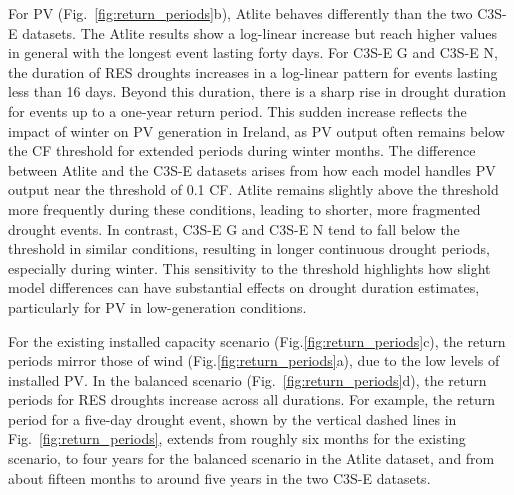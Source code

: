 \documentclass[a4paper, 11pt]{article}
\begin{document}
For PV (Fig.~\ref{fig:return_periods}b), Atlite behaves differently than the two C3S-E datasets. The Atlite results show a log-linear increase but reach higher values in general with the longest event lasting forty days. For C3S-E G and C3S-E N, the duration of RES droughts increases in a log-linear pattern for events lasting less than 16 days. Beyond this duration, there is a sharp rise in drought duration for events up to a one-year return period. This sudden increase reflects the impact of winter on PV generation in Ireland, as PV output often remains below the CF threshold for extended periods during winter months. The difference between Atlite and the C3S-E datasets arises from how each model handles PV output near the threshold of 0.1 CF. Atlite remains slightly above the threshold more frequently during these conditions, leading to shorter, more fragmented drought events. In contrast, C3S-E G and C3S-E N tend to fall below the threshold in similar conditions, resulting in longer continuous drought periods, especially during winter. This sensitivity to the threshold highlights how slight model differences can have substantial effects on drought duration estimates, particularly for PV in low-generation conditions.

For the existing installed capacity scenario (Fig.\ref{fig:return_periods}c), the return periods mirror those of wind (Fig.\ref{fig:return_periods}a), due to the low levels of installed PV. In the balanced scenario (Fig.~\ref{fig:return_periods}d), the return periods for RES droughts increase across all durations. For example, the return period for a five-day drought event, shown by the vertical dashed lines in Fig.~\ref{fig:return_periods}, extends from roughly six months for the existing scenario, to four years for the balanced scenario in the Atlite dataset, and from about fifteen months to around five years in the two C3S-E datasets. %
\end{document}
